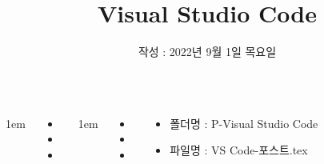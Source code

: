 \documentclass[	20pt, 
							a1paper, 
							portrait, %
							margin=0mm, %
							innermargin=10mm,  		%
							colspace=5mm, 
							subcolspace=0mm
							]{tikzposter}
\title{Visual Studio Code}
\author{ 작성 : 2022년 9월 1일 목요일 }
\begin{document}
	\maketitle

	\begin{columns}


			{
					\setlength{\leftmargini}{7em}
					\setlength{\labelsep} {1em}
				\begin{LARGE}
					\begin{itemize}
					\item 
					\item 
					\item 
					\end{itemize}
				\end{LARGE}
			}







			{
					\setlength{\leftmargini}{4em}
					\setlength{\labelsep} {1em}
				\begin{LARGE}
					\begin{itemize}
					\item 
					\item 
					\item 
					\end{itemize}
				\end{LARGE}
			}


			{
				\begin{LARGE}
					\begin{itemize}
					\item 폴더명 : P-Visual Studio Code
					\item 파일명 : VS Code-포스트.tex
					\end{itemize}
				\end{LARGE}
			}


	\end{columns}
\end{document}
